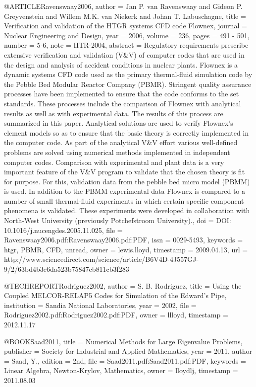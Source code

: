 {{@ARTICLE{Ravenswaay2006,
  author = {Jan P. van Ravenswaay and Gideon P. Greyvenstein and Willem M.K.
	van Niekerk and Johan T. Labuschagne},
  title = {Verification and validation of the HTGR systems CFD code Flownex},
  journal = {Nuclear Engineering and Design},
  year = {2006},
  volume = {236},
  pages = {491 - 501},
  number = {5-6},
  note = {HTR-2004},
  abstract = {Regulatory requirements prescribe extensive verification and validation
	(V&V) of computer codes that are used in the design and analysis
	of accident conditions in nuclear plants. Flownex is a dynamic systems
	CFD code used as the primary thermal-fluid simulation code by the
	Pebble Bed Modular Reactor Company (PBMR). Stringent quality assurance
	processes have been implemented to ensure that the code conforms
	to the set standards. These processes include the comparison of Flownex
	with analytical results as well as with experimental data. The results
	of this process are summarized in this paper. Analytical solutions
	are used to verify Flownex's element models so as to ensure that
	the basic theory is correctly implemented in the computer code. As
	part of the analytical V&V effort various well-defined problems are
	solved using numerical methods implemented in independent computer
	codes. Comparison with experimental and plant data is a very important
	feature of the V&V program to validate that the chosen theory is
	fit for purpose. For this, validation data from the pebble bed micro
	model (PBMM) is used. In addition to the PBMM experimental data Flownex
	is compared to a number of small thermal-fluid experiments in which
	certain specific component phenomena is validated. These experiments
	were developed in collaboration with North-West University (previously
	Potchefstroom University).},
  doi = {DOI: 10.1016/j.nucengdes.2005.11.025},
  file = {Ravenswaay2006.pdf:Ravenswaay2006.pdf:PDF},
  issn = {0029-5493},
  keywords = {htgr, PBMR, CFD, unread},
  owner = {lewis.lloyd},
  timestamp = {2009.04.13},
  url = {http://www.sciencedirect.com/science/article/B6V4D-4J557GJ-9/2/63bd4b3e6da523b75847cb811cb3f283}
}

@TECHREPORT{Rodriguez2002,
  author = {S. B. Rodriguez},
  title = {Using the Coupled {MELCOR-RELAP5} Codes for Simulation of the {Edward’s
	Pipe}},
  institution = {Sandia National Laboratories},
  year = {2002},
  file = {Rodriguez2002.pdf:Rodriguez2002.pdf:PDF},
  owner = {llloyd},
  timestamp = {2012.11.17}
}

@BOOK{Saad2011,
  title = {Numerical Methods for Large Eigenvalue Problems},
  publisher = {Society for Industrial and Applied Mathematics},
  year = {2011},
  author = {Saad, Y.},
  edition = {2nd},
  file = {Saad2011.pdf:Saad2011.pdf:PDF},
  keywords = {Linear Algebra, Newton-Krylov, Mathematics},
  owner = {lloydlj},
  timestamp = {2011.08.03}
}

}}
